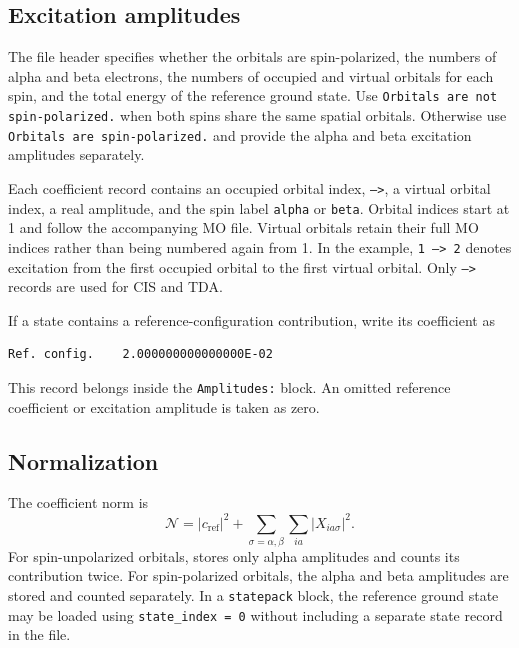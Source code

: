 \subsection*{Excitation amplitudes}
The file header specifies whether the orbitals are spin-polarized, the numbers of alpha and beta electrons, the numbers of occupied and virtual orbitals for each spin, and the total energy of the reference ground state. Use \texttt{Orbitals are not spin-polarized.} when both spins share the same spatial orbitals. Otherwise use \texttt{Orbitals are spin-polarized.} and provide the alpha and beta excitation amplitudes separately.

Each coefficient record contains an occupied orbital index, \texttt{-->}, a virtual orbital index, a real amplitude, and the spin label \texttt{alpha} or \texttt{beta}. Orbital indices start at 1 and follow the accompanying MO file. Virtual orbitals retain their full MO indices rather than being numbered again from 1. In the example, \texttt{1 --> 2} denotes excitation from the first occupied orbital to the first virtual orbital. Only \texttt{-->} records are used for CIS and TDA.

If a state contains a reference-configuration contribution, write its coefficient as
\begin{lstlisting}[style=technicalfile]
        Ref. config.    2.000000000000000E-02
\end{lstlisting}
This record belongs inside the \texttt{Amplitudes:} block. An omitted reference coefficient or excitation amplitude is taken as zero.

\subsection*{Normalization}
The coefficient norm is
\begin{equation}
\mathcal{N}=|c_{\mathrm{ref}}|^2+\sum_{\sigma=\alpha,\beta}\sum_{ia}|X_{ia\sigma}|^2.
\end{equation}
For spin-unpolarized orbitals, \progname{} stores only alpha amplitudes and counts its contribution twice. For spin-polarized orbitals, the alpha and beta amplitudes are stored and counted separately. In a \texttt{statepack} block, the reference ground state may be loaded using \texttt{state\_index = 0} without including a separate state record in the file.
